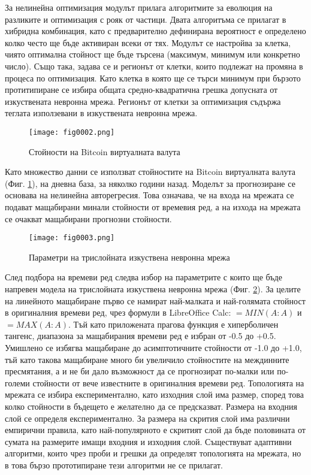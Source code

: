 За нелинейна оптимизация модулът прилага алгоритмите за еволюция на разликите и оптимизация с рояк от частици. Двата алгоритъма се прилагат в хибридна комбинация, като с предварително дефинирана вероятност е определено колко често ще бъде активиран всеки от тях. Модулът се настройва за клетка, чиято оптимална стойност ще бъде търсена (максимум, минимум или конкретно число). Също така, задава се и регионът от клетки, които подлежат на промяна в процеса по оптимизация. Като клетка в която ще се търси минимум при бързото протитипиране се избира общата средно-квадратична грешка допусната от изкуствената невронна мрежа. Регионът от клетки за оптимизация съдържа теглата използевани в изкуствената невронна мрежа. 

\begin{figure}[H]
  \centering
  \texttt{[image: fig0002.png]}
  \caption{Стойности на Bitcoin виртуалната валута}
\label{fig0002}
\end{figure}

Като множество данни се използват стойностите на Bitcoin виртуалната валута (Фиг. \ref{fig0002}), на дневна база, за няколко години назад. Моделът за прогнозиране се основава на нелинейна авторегресия. Това означава, че на входа на мрежата се подават мащабирани минали стойности от времевия ред, а на изхода на мрежата се очакват мащабирани прогнозни стойности. 

\begin{figure}[H]
  \centering
  \texttt{[image: fig0003.png]}
  \caption{Параметри на трислойната изкуствена невронна мрежа}
\label{fig0003}
\end{figure}

След подбора на времеви ред следва избор на параметрите с които ще бъде напревен модела на трислойната изкуствена невронна мрежа (Фиг. \ref{fig0003}). За целите на линейното мащабиране първо се намират най-малката и най-голямата стойност в оригиналния времеви ред, чрез формули в LibreOffice Calc: $=MIN(A:A)$ и $=MAX(A:A)$. Тъй като приложената прагова функция е хиперболичен тангенс, диапазона за мащабирания времеви ред е избран от -0.5 до +0.5. Умишлено се избягва мащабиране до асимптотичните стойности от -1.0 до +1.0, тъй като такова мащабиране много би увеличило стойностите на междинните пресмятания, а и не би дало възможност да се прогнозират по-малки или по-големи стойности от вече известните в оригиналния времеви ред. Топологията на мрежата се избира експериментално, като изходния слой има размер, според това колко стойности в бъдещето е желателно да се предсказват. Размера на входния слой се определя експериментално. За размера на скрития слой има различни емпирични правила, като най-популярното е скритият слой да бъде половината от сумата на размерите имащи входния и изходния слой. Съществуват адаптивни алгоритми, които чрез проби и грешки да определят топологията на мрежата, но в това бързо прототипиране тези алгоритми не се прилагат. 

